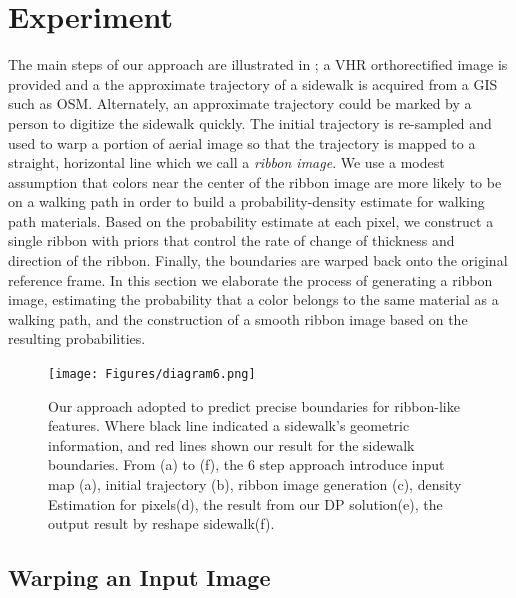 \chapter{Experiment}

The main steps of our approach are illustrated in ; a \ac{VHR} orthorectified image is provided and a the approximate trajectory of a sidewalk is acquired from a \ac{GIS} such as \ac{OSM}.
Alternately, an approximate trajectory could be marked by a person to digitize the sidewalk quickly. 
The initial trajectory is re-sampled and used to warp a portion of aerial image so that the trajectory is mapped to a straight, horizontal line which we call a \textit{ribbon image}. 
We use a modest assumption that colors near the center of the ribbon image are more likely to be on a walking path in order to build a probability-density estimate for walking path materials. 
Based on the probability estimate at each pixel, we construct a single ribbon with priors that control the rate of change of thickness and direction of the ribbon. 
Finally, the boundaries are warped back onto the original reference frame. 
In this section we elaborate the process of generating a ribbon image, estimating the probability that a color belongs to the same material as a walking path, and the construction of a smooth ribbon image based on the resulting probabilities. 

\begin{figure}[H]
\begin{center}
\texttt{[image: Figures/diagram6.png]}
\caption[Framework Overview]{Our approach adopted to predict precise boundaries for ribbon-like features. Where black line indicated a sidewalk's geometric information, and red lines shown our result for the sidewalk boundaries. From (a) to (f), the 6 step approach introduce input map (a), initial trajectory (b), ribbon image generation (c), density Estimation for pixels(d), the result from our \ac{DP} solution(e), the output result by reshape sidewalk(f).}
\label{fig:Apparatus}
\end{center}
\end{figure}

\section{Warping an Input Image}

